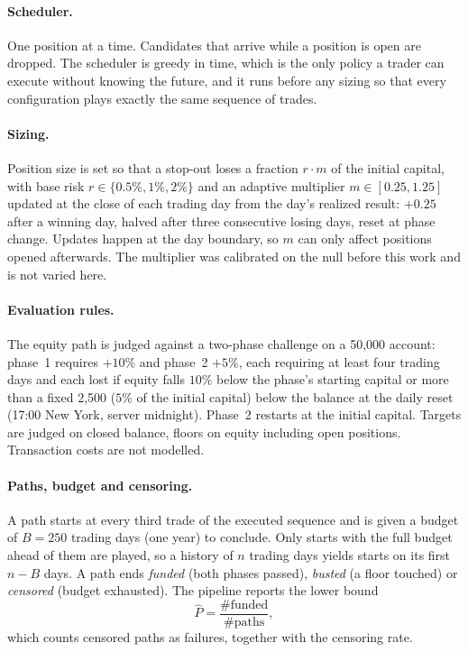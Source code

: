 \documentclass[11pt]{article}
\newcommand{\Pf}{\hat{P}}
\begin{document}
\paragraph{Scheduler.}
One position at a time. Candidates that arrive while a position is open are dropped. The scheduler is greedy in time, which is the only policy a trader can execute without knowing the future, and it runs before any sizing so that every configuration plays exactly the same sequence of trades.

\paragraph{Sizing.}
Position size is set so that a stop-out loses a fraction $r \cdot m$ of the initial capital, with base risk $r \in \{0.5\%, 1\%, 2\%\}$ and an adaptive multiplier $m \in [0.25, 1.25]$ updated at the close of each trading day from the day's realized result: $+0.25$ after a winning day, halved after three consecutive losing days, reset at phase change. Updates happen at the day boundary, so $m$ can only affect positions opened afterwards. The multiplier was calibrated on the null before this work and is not varied here.

\paragraph{Evaluation rules.}
The equity path is judged against a two-phase challenge on a 50,000 account: phase~1 requires $+10\%$ and phase~2 $+5\%$, each requiring at least four trading days and each lost if equity falls $10\%$ below the phase's starting capital or more than a fixed 2,500 ($5\%$ of the initial capital) below the balance at the daily reset (17:00 New York, server midnight). Phase~2 restarts at the initial capital. Targets are judged on closed balance, floors on equity including open positions. Transaction costs are not modelled.

\paragraph{Paths, budget and censoring.}
A path starts at every third trade of the executed sequence and is given a budget of $B = 250$ trading days (one year) to conclude. Only starts with the full budget ahead of them are played, so a history of $n$ trading days yields starts on its first $n - B$ days. A path ends \emph{funded} (both phases passed), \emph{busted} (a floor touched) or \emph{censored} (budget exhausted). The pipeline reports the lower bound
\begin{equation}
\Pf = \frac{\#\text{funded}}{\#\text{paths}},
\label{eq:lb}
\end{equation}
which counts censored paths as failures, together with the censoring rate.
\end{document}

